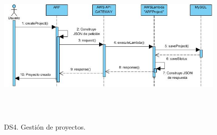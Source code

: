 \begin{figure}[h!]
	\centering
	\includegraphics[width=14cm,height=8cm]{imagenes/analisis/ds/CreateProject.jpg}
	\caption{DS4. Gestión de proyectos.}
	\label{fig:dsreccuenta}
\end{figure}




